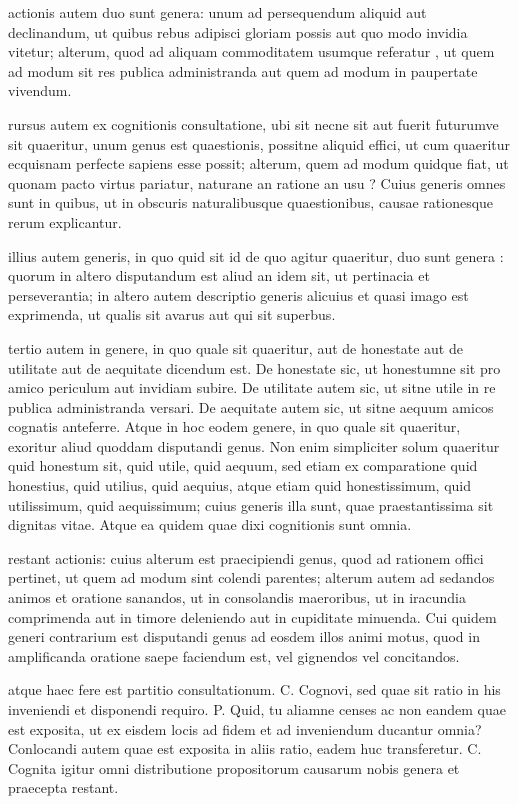  actionis autem duo sunt genera: unum ad persequendum aliquid aut declinandum, ut quibus rebus adipisci gloriam possis aut quo modo invidia vitetur; alterum, quod ad aliquam commoditatem usumque referatur , ut quem ad modum sit res publica administranda aut quem ad modum in paupertate vivendum.

 rursus autem ex cognitionis consultatione, ubi sit necne sit aut fuerit futurumve sit quaeritur, unum genus est quaestionis, possitne aliquid effici, ut cum quaeritur ecquisnam perfecte sapiens esse possit; alterum, quem ad modum quidque fiat, ut quonam pacto virtus pariatur, naturane an ratione an usu ? Cuius generis omnes sunt in quibus, ut in obscuris naturalibusque quaestionibus, causae rationesque rerum explicantur.

 illius autem generis, in quo quid sit id de quo agitur quaeritur, duo sunt genera : quorum in altero disputandum est aliud an idem sit, ut pertinacia et perseverantia; in altero autem descriptio generis alicuius et quasi imago est exprimenda, ut qualis sit avarus aut qui sit superbus.

 tertio autem in genere, in quo quale sit quaeritur, aut de honestate aut de utilitate aut de aequitate dicendum est. De honestate sic, ut honestumne sit pro amico periculum aut invidiam subire. De utilitate autem sic, ut sitne utile in re publica administranda versari. De aequitate autem sic, ut sitne aequum amicos cognatis anteferre. Atque in hoc eodem genere, in quo quale sit quaeritur, exoritur aliud quoddam disputandi genus. Non enim simpliciter solum quaeritur quid honestum sit, quid utile, quid aequum, sed etiam ex comparatione quid honestius, quid utilius, quid aequius, atque etiam quid honestissimum, quid utilissimum, quid aequissimum; cuius generis illa sunt, quae praestantissima sit dignitas vitae. Atque ea quidem quae dixi cognitionis sunt omnia.

 restant actionis: cuius alterum est praecipiendi genus, quod ad rationem offici pertinet, ut quem ad modum sint colendi parentes; alterum autem ad sedandos animos et oratione sanandos, ut in consolandis maeroribus, ut in iracundia comprimenda aut in timore deleniendo aut in cupiditate minuenda. Cui quidem generi contrarium est disputandi genus ad eosdem illos animi motus, quod in amplificanda oratione saepe faciendum est, vel gignendos vel concitandos.

 atque haec fere est partitio consultationum. C. Cognovi, sed quae sit ratio in his inveniendi et disponendi requiro. P. Quid, tu aliamne censes ac non eandem quae est exposita, ut ex eisdem locis ad fidem et ad inveniendum ducantur omnia? Conlocandi autem quae est exposita in aliis ratio, eadem huc transferetur. C. Cognita igitur omni distributione propositorum causarum nobis genera et praecepta restant.

